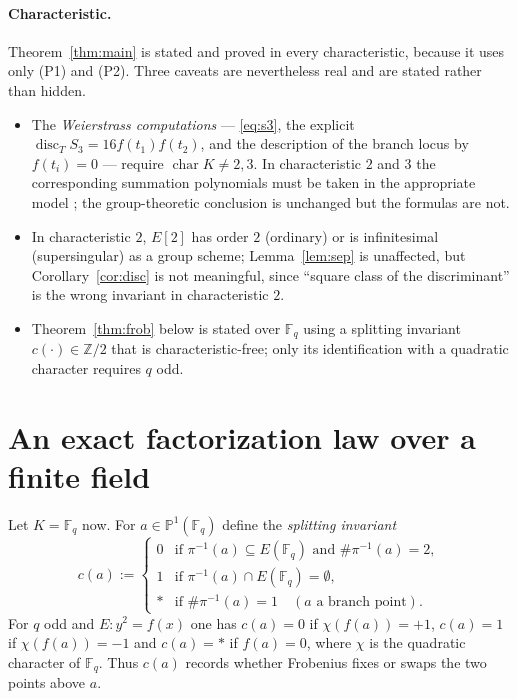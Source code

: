 \documentclass[11pt,a4paper]{article}
\theoremstyle{plain}
\theoremstyle{definition}
\DeclareMathOperator{\disc}{disc}
\newcommand{\PP}{\mathbb{P}}
\newcommand{\FF}{\mathbb{F}}
\newcommand{\ZZ}{\mathbb{Z}}
\newcommand{\Fq}{\FF_q}
\begin{document}
\paragraph{Characteristic.}
Theorem~\ref{thm:main} is stated and proved in every characteristic, because it
uses only (P1) and (P2). Three caveats are nevertheless real and are stated
rather than hidden.
\begin{itemize}
\item The \emph{Weierstrass computations} --- \eqref{eq:s3}, the explicit
  $\disc_T S_3 = 16 f(t_1) f(t_2)$, and the description of the branch locus by
  $f(t_i) = 0$ --- require $\operatorname{char} K \neq 2,3$. In characteristic $2$
  and $3$ the corresponding summation polynomials must be taken in the
  appropriate model \cite{gg2014}; the group-theoretic conclusion is unchanged
  but the formulas are not.
\item In characteristic $2$, $E[2]$ has order $2$ (ordinary) or is infinitesimal
  (supersingular) as a group scheme; Lemma~\ref{lem:sep} is unaffected, but
  Corollary~\ref{cor:disc} is not meaningful, since ``square class of the
  discriminant'' is the wrong invariant in characteristic $2$.
\item Theorem~\ref{thm:frob} below is stated over $\Fq$ using a splitting
  invariant $c(\cdot) \in \ZZ/2$ that is characteristic-free; only its
  identification with a quadratic character requires $q$ odd.
\end{itemize}

\section{An exact factorization law over a finite field}\label{sec:frob}

Let $K = \Fq$ now. For $a \in \PP^1(\Fq)$ define the \emph{splitting invariant}
\begin{equation}\label{eq:c}
  c(a) := \begin{cases}
    0 & \text{if } \pi^{-1}(a) \subseteq E(\Fq) \text{ and } \#\pi^{-1}(a) = 2, \\
    1 & \text{if } \pi^{-1}(a) \cap E(\Fq) = \emptyset, \\
    \ast & \text{if } \#\pi^{-1}(a) = 1 \quad (a \text{ a branch point}).
  \end{cases}
\end{equation}
For $q$ odd and $E : y^2 = f(x)$ one has $c(a) = 0$ if $\chi(f(a)) = +1$,
$c(a) = 1$ if $\chi(f(a)) = -1$ and $c(a) = \ast$ if $f(a) = 0$, where $\chi$ is
the quadratic character of $\Fq$. Thus $c(a)$ records whether Frobenius fixes or
swaps the two points above $a$.
\end{document}
